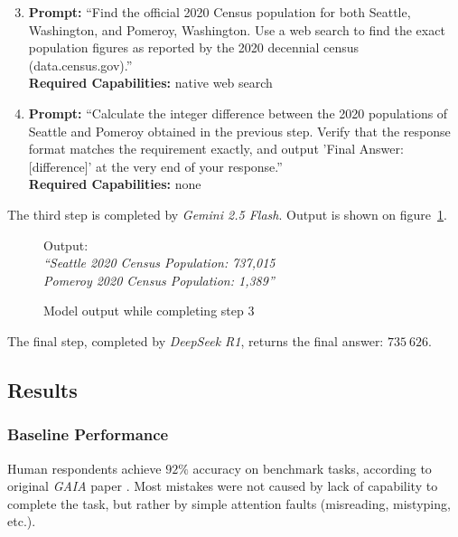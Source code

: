 \documentclass[a4paper,11pt,twoside]{report}
\theoremstyle{definition}
\begin{document}
\begin{enumerate}
    \setcounter{enumi}{2}
    \item \textbf{Prompt:} ``Find the official 2020 Census population for both Seattle, Washington, and Pomeroy, Washington. Use a web search to find the exact population figures as reported by the 2020 decennial census (data.census.gov).'' \\
    \textbf{Required Capabilities:} native web search
    \item \textbf{Prompt:} ``Calculate the integer difference between the 2020 populations of Seattle and Pomeroy obtained in the previous step. Verify that the response format matches the requirement exactly, and output 'Final Answer: [difference]' at the very end of your response.'' \\
    \textbf{Required Capabilities:} none
\end{enumerate}

The third step is completed by \textit{Gemini 2.5 Flash}. Output is shown on figure~\ref{figure:gaia-question-task-execution-example-step-3}.

\begin{figure}[htbp]
    \begin{framed}
        Output: \\
        \textit{``Seattle 2020 Census Population: 737,015 \\
        Pomeroy 2020 Census Population: 1,389''}
    \end{framed}
    \caption{Model output while completing step 3}
    \label{figure:gaia-question-task-execution-example-step-3}
\end{figure}

The final step, completed by \textit{DeepSeek R1}, returns the final answer: $735~626$.

\subsection{Results}

\subsubsection{Baseline Performance}

Human respondents achieve $92\%$ accuracy on benchmark tasks, according to original \textit{GAIA} paper \cite{mialon2023gaia}. Most mistakes were not caused by lack of capability to complete the task, but rather by simple attention faults (misreading, mistyping, etc.).
\end{document}
